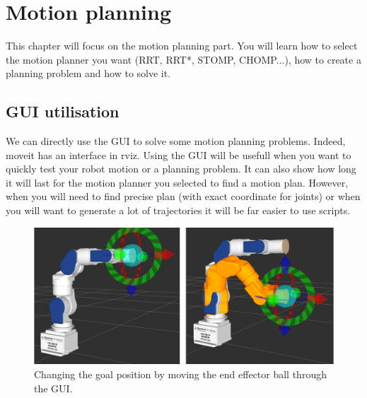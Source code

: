\chapter{Motion planning}

This chapter will focus on the motion planning part. You will learn how to select the motion planner you want (RRT, RRT*, STOMP, CHOMP...), how to create a planning problem and how to solve it.

\section{GUI utilisation}

We can directly use the GUI to solve some motion planning problems. Indeed, moveit has an interface in rviz. Using the GUI will be usefull when you want to quickly test your robot motion or a planning problem. It can also show how long it will last for the motion planner you selected to find a motion plan. However, when you will need to find precise plan (with exact coordinate for joints) or when you will want to generate a lot of trajectories it will be far easier to use scripts.


\begin{figure}
\includegraphics[scale=0.27]{images/motion_planning/gui_end_effector.png}
\centering
\caption{Changing the goal position by moving the end effector ball through the GUI.}
\label{fig:gui_end_effector}
\end{figure}